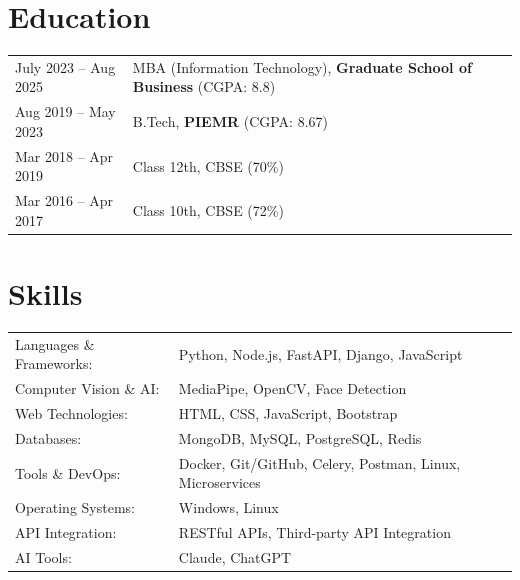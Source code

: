 \documentclass[a4paper,11pt]{article}
\begin{document}
\section{Education}
\begin{tabularx}{\linewidth}{@{}l X@{}}
July 2023 -- Aug 2025 & MBA (Information Technology), \textbf{Graduate School of Business} \hfill (CGPA: 8.8) \\[4pt]

Aug 2019 -- May 2023 & B.Tech, \textbf{PIEMR} \hfill (CGPA: 8.67) \\[4pt]

Mar 2018 -- Apr 2019 & Class 12th, CBSE \hfill (70\%) \\[4pt]

Mar 2016 -- Apr 2017 & Class 10th, CBSE \hfill (72\%) \\
\end{tabularx}

\section{Skills}
\begin{tabularx}{\linewidth}{@{}l X@{}}
Languages \& Frameworks: & \normalsize{Python, Node.js, FastAPI, Django, JavaScript} \\[2pt]

Computer Vision \& AI: & \normalsize{MediaPipe, OpenCV, Face Detection} \\[2pt]

Web Technologies: & \normalsize{HTML, CSS, JavaScript, Bootstrap} \\[2pt]

Databases: & \normalsize{MongoDB, MySQL, PostgreSQL, Redis} \\[2pt]

Tools \& DevOps: & \normalsize{Docker, Git/GitHub, Celery, Postman, Linux, Microservices} \\[2pt]

Operating Systems: & \normalsize{Windows, Linux} \\[2pt]

API Integration: & \normalsize{RESTful APIs, Third-party API Integration} \\[2pt]

AI Tools: & \normalsize{Claude, ChatGPT}
\end{tabularx}
\end{document}
